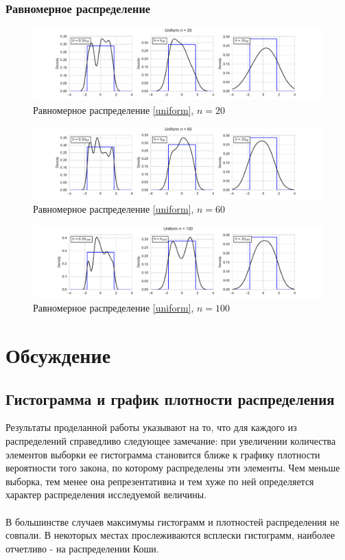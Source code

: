 \documentclass[a4paper]{article}
\begin{document}
\subsubsection{Равномерное распределение}
\begin{figure}[H]
    \centering
    \includegraphics[width = 16 cm]{sources/unifKde20.pdf}
    \caption{Равномерное распределение \eqref{uniform}, $n = 20$}
    \label{fig:uniformKDE20}
\end{figure}
\begin{figure}[H]
    \centering
    \includegraphics[width = 16 cm]{sources/unifKde60.pdf}
    \caption{Равномерное распределение \eqref{uniform}, $n = 60$}
    \label{fig:uniformKDE60}
\end{figure}
\begin{figure}[H]
    \centering
    \includegraphics[width = 16 cm]{sources/unifKde100.pdf}
    \caption{Равномерное распределение \eqref{uniform}, $n = 100$}
    \label{fig:uniformKDE100}
\end{figure}
\section{Обсуждение}
\subsection{Гистограмма и график плотности распределения}
Результаты проделанной работы указывают на то, что для каждого из распределений справедливо следующее замечание: при увеличении количества элементов выборки ее гистограмма становится ближе к графику плотности вероятности того закона, по которому распределены эти элементы. Чем меньше выборка, тем менее она репрезентативна и тем хуже по ней определяется характер распределения исследуемой величины.\\
\\
В большинстве случаев максимумы гистограмм и плотностей распределения не совпали. В некоторых местах прослеживаются всплески гистограмм, наиболее отчетливо - на распределении Коши.
\end{document}
